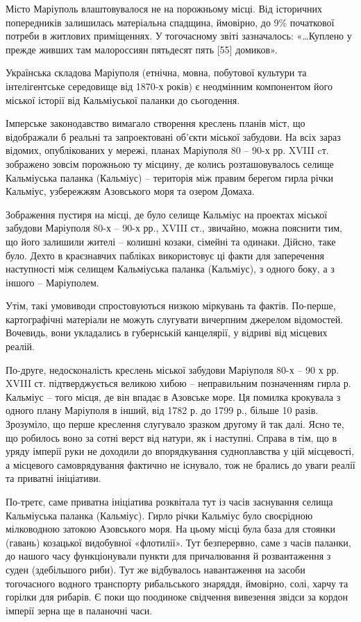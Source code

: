 Місто Маріуполь влаштовувалося не на порожньому місці. Від  історичних
попередників залишилась матеріальна спадщина, ймовірно, до 9\% початкової
потреби в житлових приміщеннях. У тогочасному звіті зазначалось: «…Куплено  у
прежде живших там малороссиян пятьдесят пять [55] домиков». 

Українська складова Маріуполя (етнічна, мовна, побутової культури та
інтелігентське середовище від 1870-х років) є неодмінним компонентом його
міської історії від Кальміуської паланки до сьогодення.

Імперське законодавство вимагало створення креслень планів міст, що відображали
б реальні та запроектовані об’єкти міської забудови. На всіх зараз відомих,
опублікованих у мережі, планах Маріуполя 80 – 90-х рр. XVIII cт. зображено
зовсім порожньою ту місцину, де колись розташовувалось селище Кальміуська
паланка (Кальміус) – територія між правим берегом гирла річки Кальміус,
узбережжям Азовського моря та озером Домаха. 

Зображення пустиря на місці, де було селище Кальміус на проектах міської забудови Маріуполя 80-х – 90-х рр., XVIII ст., звичайно, можна пояснити тим, що його залишили жителі – колишні козаки, сімейні та одинаки. Дійсно, таке було. Дехто в краєзнавчих пабліках використовує ці факти для заперечення наступності між селищем Кальміуська паланка (Кальміус), з одного боку, а з іншого – Маріуполем. 

Утім,  такі умовиводи спростовуються низкою міркувань та фактів.  По-перше,
картографічні матеріали не можуть слугувати вичерпним джерелом відомостей.
Вочевидь, вони укладались в губернській канцелярії, у відриві від місцевих
реалій. 

По-друге, недосконалість креслень міської забудови Маріуполя 80-х – 90 х рр.
XVIII ст. підтверджується великою хибою – неправильним позначенням гирла р.
Кальміус – того місця, де він впадає в Азовське море. Ця помилка крокувала з
одного плану Маріуполя в інший, від 1782 р. до 1799 р., більше 10 разів.
Зрозуміло, що перше креслення слугувало зразком другому й так далі. Ясно те, що
робилось воно за сотні верст від натури, як і наступні. Справа в тім, що в
уряду імперії руки не доходили до впорядкування судноплавства у цій місцевості,
а місцевого самоврядування фактично не існувало, тож не брались до уваги реалії
та приватні ініціативи.

По-третє, саме приватна ініціатива розквітала тут із часів заснування селища
Кальміуська паланка (Кальміус). Гирло річки Кальміус було своєрідною
мілководною затокою Азовського моря. На цьому місці була база для стоянки
(гавань) козацької видобувної «флотилії». Тут безперервно, саме з часів
паланки, до нашого часу функціонували пункти для причалювання й розвантаження з
суден (здебільшого риби). Тут же відбувалось навантаження на засоби тогочасного
водного транспорту рибальського знаряддя, ймовірно, солі, харчу та горілки для
рибарів. Є поки що поодиноке свідчення вивезення звідси за кордон імперії зерна
ще в паланочні часи. 

